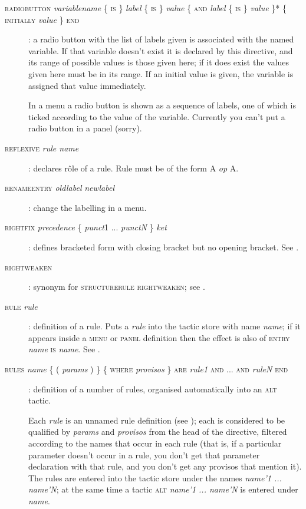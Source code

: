\begin{description}
\item[\textsc{radiobutton} \textit{variablename} \{ \textsc{is} \} \textit{label} \{ \textsc{is} \} \textit{value} \{ \textsc{and} \textit{label} \{ \textsc{is} \} \textit{value} \}* \{ \textsc{initially} \textit{value} \} \textsc{end}]: a radio button with the list of labels given is associated with the named variable. If that variable doesn't exist it is declared by this directive, and its range of possible values is those given here; if it does exist the values given here must be in its range. If an initial value is given, the variable is assigned that value immediately.

In a menu a radio button is shown as a sequence of labels, one of which is ticked according to the value of the variable. Currently you can't put a radio button in a panel (sorry).%

\item[\textsc{reflexive} \textit{rule name}]: declares r\^ole of a rule. Rule must be of the form A \textit{op} A.

\item[\textsc{renameentry} \textit{oldlabel} \textit{newlabel}]: change the labelling in a menu.

\item[\textsc{rightfix} \textit{precedence} \{ \textit{punct}1 ... \textit{punctN} \} \textit{ket}]: defines bracketed form with closing bracket but no opening bracket. See .

\item[\textsc{rightweaken}]: synonym for \textsc{structurerule} \textsc{rightweaken}; see .

\item[\textsc{rule} \textit{rule}]: definition of a rule. Puts a \textit{rule} into the tactic store with name \textit{name}; if it appears inside a \textsc{menu} or \textsc{panel} definition then the effect is also of \textsc{entry} \textit{name} \textsc{is} \textit{name}. See .

\item[\textsc{rules} \textit{name} \{ ( \textit{params} ) \} \{ \textsc{where} \textit{provisos} \} \textsc{are} \textit{rule1} \textsc{and ... and} \textit{ruleN} \textsc{end}]: definition of a number of rules, organised automatically into an \textsc{alt} tactic.

Each \textit{rule} is an unnamed rule definition (see ); each is considered to be qualified by \textit{params} and \textit{provisos} from the head of the directive, filtered according to the names that occur in each rule (that is, if a particular parameter doesn't occur in a rule, you don't get that parameter declaration with that rule, and you don't get any provisos that mention it). The rules are entered into the tactic store under the names \textit{name'1 ... name'N}; at the same time a tactic \textsc{alt} \textit{name'1 ... name'N} is entered under \textit{name}.


\end{description}
